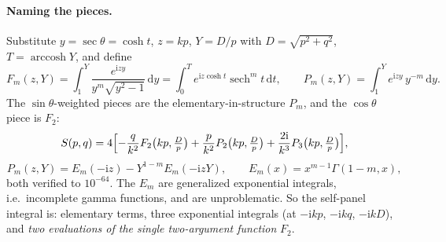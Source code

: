 \documentclass[11pt]{article}
\theoremstyle{remark}
\newcommand{\dd}{\mathrm{d}}
\newcommand{\ii}{\mathrm{i}}
\begin{document}
\paragraph{Naming the pieces.} Substitute $y = \sec\theta = \cosh t$, $z = kp$,
$Y = D/p$ with $D = \sqrt{p^2+q^2}$, $T = \operatorname{arccosh}Y$, and define
\begin{equation}
F_m(z,Y) = \int_1^Y \frac{e^{\ii z y}}{y^m\sqrt{y^2-1}}\,\dd y = \int_0^T e^{\ii z\cosh t}\operatorname{sech}^m t\,\dd t,
\qquad
P_m(z,Y) = \int_1^Y e^{\ii z y}\,y^{-m}\,\dd y .
\end{equation}
The $\sin\theta$-weighted pieces are the elementary-in-structure $P_m$, and the
$\cos\theta$ piece is $F_2$:
\begin{equation}
S(p,q) = 4\Bigl[-\frac{q}{k^2}F_2\bigl(kp,\tfrac{D}{p}\bigr) + \frac{p}{k^2}P_2\bigl(kp,\tfrac{D}{p}\bigr) + \frac{2\ii}{k^3}P_3\bigl(kp,\tfrac{D}{p}\bigr)\Bigr],
\end{equation}
\begin{equation}
P_m(z,Y) = E_m(-\ii z) - Y^{1-m}E_m(-\ii zY),\qquad E_m(x) = x^{m-1}\Gamma(1-m, x),
\end{equation}
both verified to $10^{-64}$. The $E_m$ are generalized exponential integrals, i.e.\
incomplete gamma functions, and are unproblematic. So the self-panel integral is:
elementary terms, three exponential integrals (at $-\ii kp$, $-\ii kq$, $-\ii kD$), and
\emph{two evaluations of the single two-argument function} $F_2$.
\end{document}
